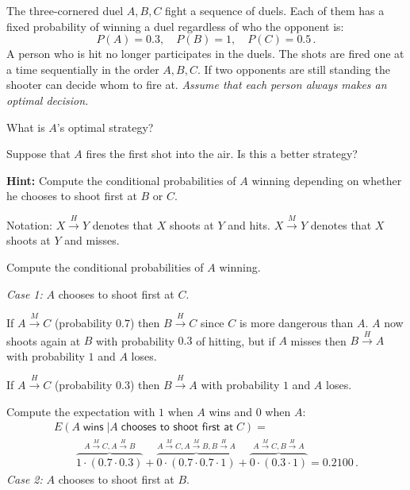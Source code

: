 \begin{prob}{The three-cornered duel}
$A,B,C$ fight a sequence of duels. Each of them has a fixed probability of winning a duel regardless of who the opponent is:
\[
P(A)=0.3,\quad P(B)=1, \quad P(C)=0.5\,.
\]
A person who is hit no longer participates in the duels. The shots are fired one at a time sequentially in the order $A,B,C$. If two opponents are still standing the shooter can decide whom to fire at. \emph{Assume that each person always makes an optimal decision.} 

 What is $A$'s optimal strategy?

 Suppose that $A$ fires the first shot into the air. Is this a better strategy?

\textbf{Hint:} Compute the conditional probabilities of $A$ winning depending on whether he chooses to shoot first at $B$ or $C$.
\end{prob}

\solution{}

Notation: $X\stackrel{H}{\longrightarrow}Y$ denotes that $X$ shoots at $Y$ and hits. $X\stackrel{M}{\longrightarrow}Y$ denotes that $X$ shoots at $Y$ and misses.

Compute the conditional probabilities of $A$ winning.

\textit{Case 1:} $A$ chooses to shoot first at $C$.

If $A\stackrel{M}{\longrightarrow}C$ (probability $0.7$) then $B\stackrel{H}{\longrightarrow}C$ since $C$ is more dangerous than $A$. $A$ now shoots again at $B$ with probability $0.3$ of hitting, but if $A$ misses then $B\stackrel{H}{\longrightarrow}A$ with probability $1$ and $A$ loses.

If $A\stackrel{H}{\longrightarrow}C$ (probability $0.3$) then $B\stackrel{H}{\longrightarrow}A$ with probability $1$ and $A$ loses.

Compute the expectation with $1$ when $A$ wins and $0$ when $A$:
\vspace*{-3ex}
\[
\renewcommand*{\arraystretch}{2.5}
\begin{array}{l}
E(A \;\textsf{wins}\;|A\;\textsf{chooses to shoot first at}\;C) =\\
\qquad \overbrace{1\cdot (0.7\cdot 0.3)}^{A\stackrel{M}{\longrightarrow}C, A\stackrel{H}{\longrightarrow}B}+ \overbrace{0\cdot (0.7\cdot 0.7\cdot 1)}^{A\stackrel{M}{\longrightarrow}C, A\stackrel{M}{\longrightarrow}B, B\stackrel{H}{\longrightarrow}A}+ \overbrace{0\cdot (0.3\cdot 1)}^{A\stackrel{M}{\longrightarrow}C, B\stackrel{H}{\longrightarrow}A}=0.2100\,.
\end{array}
\]
\textit{Case 2:} $A$ chooses to shoot first at $B$.

